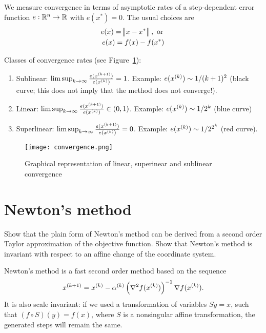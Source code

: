 \documentclass{article}
\begin{document}
We measure convergence in terms of asymptotic rates of a step-dependent error function
\(e: \RR^n \to \RR\) with \(e(x^*) = 0\).  The usual choices are
\begin{gather*}
  e(x) = \enVert[1]{x - x^*}, \text{ or } \\
  e(x) = f(x) - f(x^*)
\end{gather*}

Classes of convergence rates (see Figure~\ref{fig:convergence}):
\begin{enumerate}
\item Sublinear: \(\limsup_{k \to \infty} \frac{e(\kth[k+1]{x})}{e(\kth{x})} = 1\). Example:
  \(e(\kth{x}) \sim 1/(k + 1)^2\) (black curve; this does not imply that the method does not
  converge!).
\item Linear: \(\limsup_{k \to \infty} \frac{e(\kth[k+1]{x})}{e(\kth{x})} \in (0, 1)\).
  Example: \(e(\kth{x}) \sim 1/2^k\) (blue curve)
\item Superlinear: \(\limsup_{k \to \infty} \frac{e(\kth[k+1]{x})}{e(\kth{x})} = 0\). Example:
  \(e(\kth{x}) \sim 1/2^{2^k}\) (red curve).
\end{enumerate}

\begin{figure}[H]
  \centering
  \texttt{[image: convergence.png]}
  \caption{Graphical representation of linear, superinear and sublinear
    convergence \label{fig:convergence}}
\end{figure}

\section{Newton's method}

\begin{question}
  Show that the plain form of Newton’s method can be derived from a second order Taylor
  approximation of the objective function. Show that Newton’s method is invariant with respect to an
  affine change of the coordinate system.
\end{question}

Newton's method is a fast second order method based on the sequence
\begin{equation*}
  \kth[k+1]{x} = \kth{x} - \kth{\alpha}\left( \nabla^2 f(\kth{x}) \right)^{-1} \nabla f(\kth{x}).
\end{equation*}
It is also scale invariant: if we used a transformation of variables \(Sy = x\), such that
\((f \circ S)(y) = f(x)\), where \(S\) is a nonsingular affine transformation, the generated steps
will remain the same.
\end{document}
